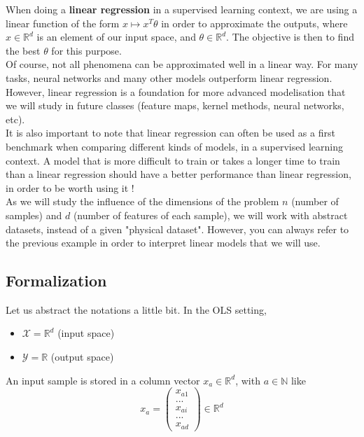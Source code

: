 \documentclass[
10pt, %
a4paper, %
oneside, %
headinclude,footinclude, %
BCOR5mm, %
]{scrartcl}
\begin{document}
When doing a \textbf{linear regression} in a supervised learning context, we are using a linear function of the form $x\mapsto x^T\theta$ in order to approximate the outputs, where $x\in \mathbb{R}^d$ is an element of our input space, and $\theta\in \mathbb{R}^d$. The objective is then to find the best $\theta$ for this purpose.
\\

Of course, not all phenomena can be approximated well in a linear way. For many tasks, neural networks and many other models outperform linear regression.  However,
linear regression is a foundation for more advanced modelisation that we will
study in future classes (feature maps, kernel methods, neural networks, etc).
\\

It is also important to note that linear regression can often be used as a first benchmark when comparing different kinds of models, in a supervised learning context. A model that is more difficult to train or takes a longer time to train than a linear regression should have a better performance than linear regression, in order to be worth using it !
\\

As we will study the influence of the dimensions of the problem $n$ (number of
samples) and $d$ (number of features of each sample), we
will work with abstract datasets, instead of a given "physical dataset".
However, you can always refer to the previous example in order to interpret
linear models that we will use.

\subsection{Formalization}
\label{sec:formalization}

Let us abstract the notations a little bit. In the OLS setting,
\begin{itemize}
	\item $ \mathcal{X} = \mathbb{R}^d$ (input space)
	\item $ \mathcal{Y}  = \mathbb{R} $ (output space)
\end{itemize}

An input sample is stored in a column vector $x_a\in \mathbb{R}^d$, with $a\in \mathbb{N}$ like
\begin{equation}
    x_a=
\begin{pmatrix}
x_{a1}\\
...\\
x_{ai}\\
...\\
x_{ad}
\end{pmatrix}\in \mathbb{R}^d
\end{equation}
\end{document}
